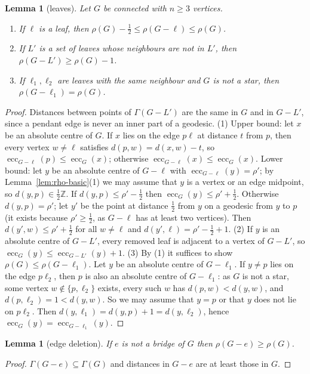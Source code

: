 \documentclass[11pt]{amsart}
\newtheorem{lemma}[theorem]{Lemma}
\theoremstyle{definition}
\newcommand{\ecc}{\operatorname{ecc}}
\begin{document}
\begin{lemma}[leaves]\label{lem:rholeaf}
Let $G$ be connected with $n\ge3$ vertices.
\begin{enumerate}[label=(\arabic*)]
\item If $\ell$ is a leaf, then $\rho(G)-\frac12\le\rho(G-\ell)\le\rho(G)$.
\item If $L'$ is a set of leaves whose neighbours are not in $L'$, then $\rho(G-L')\ge\rho(G)-1$.
\item If $\ell_1,\ell_2$ are leaves with the same neighbour and $G$ is not a star, then
      $\rho(G-\ell_1)=\rho(G)$.
\end{enumerate}
\end{lemma}
\begin{proof}
Distances between points of $\Gamma(G-L')$ are the same in $G$ and in $G-L'$, since a pendant edge is never
an inner part of a geodesic.
(1) Upper bound: let $x$ be an absolute centre of $G$. If $x$ lies on the edge $p\ell$ at distance
$t$ from $p$, then every vertex $w\ne\ell$ satisfies $d(p,w)=d(x,w)-t$, so $\ecc_{G-\ell}(p)\le\ecc_G(x)$;
otherwise $\ecc_{G-\ell}(x)\le\ecc_G(x)$. Lower bound: let $y$ be an absolute centre of $G-\ell$ with
$\ecc_{G-\ell}(y)=\rho'$; by Lemma~\ref{lem:rho-basic}(1) we may assume that $y$ is a vertex or an edge
midpoint, so $d(y,p)\in\frac12\mathbb Z$. If $d(y,p)\le\rho'-\frac12$ then $\ecc_G(y)\le\rho'+\frac12$.
Otherwise $d(y,p)=\rho'$; let $y'$ be the point at distance $\frac12$ from $y$ on a geodesic from $y$ to
$p$ (it exists because $\rho'\ge\frac12$, as $G-\ell$ has at least two vertices). Then $d(y',w)\le\rho'+\frac12$ for all $w\ne\ell$ and $d(y',\ell)=\rho'-\frac12+1$.
(2) If $y$ is an absolute centre of $G-L'$, every removed leaf is adjacent to a vertex of $G-L'$, so
$\ecc_G(y)\le\ecc_{G-L'}(y)+1$.
(3) By (1) it suffices to show $\rho(G)\le\rho(G-\ell_1)$. Let $y$ be an absolute centre of
$G-\ell_1$. If $y\ne p$ lies on the edge $p\ell_2$, then $p$ is also an absolute centre of $G-\ell_1$: as
$G$ is not a star, some vertex $w\notin\{p,\ell_2\}$ exists, every such $w$ has $d(p,w)<d(y,w)$, and
$d(p,\ell_2)=1<d(y,w)$. So we may assume that $y=p$ or that $y$ does not lie on $p\ell_2$. Then
$d(y,\ell_1)=d(y,p)+1=d(y,\ell_2)$, hence $\ecc_G(y)=\ecc_{G-\ell_1}(y)$.
\end{proof}

\begin{lemma}[edge deletion]\label{lem:rhoedge}
If $e$ is not a bridge of $G$ then $\rho(G-e)\ge\rho(G)$.
\end{lemma}
\begin{proof}
$\Gamma(G-e)\subseteq\Gamma(G)$ and distances in $G-e$ are at least those in $G$.
\end{proof}
\end{document}
